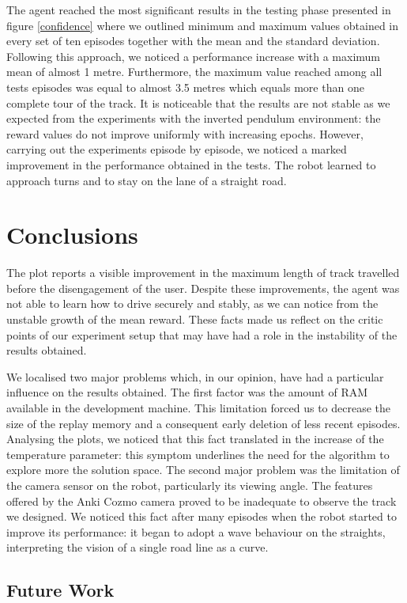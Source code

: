 \documentclass[10pt,twocolumn,letterpaper]{article}
\begin{document}
The agent reached the most significant results in the testing phase presented in figure \ref{confidence} where we outlined minimum and maximum values obtained in every set of ten episodes together with the mean and the standard deviation.
Following this approach, we noticed a performance increase with a maximum mean of almost 1 metre.
Furthermore, the maximum value reached among all tests episodes was equal to almost 3.5 metres which equals more than one complete tour of the track.
It is noticeable that the results are not stable as we expected from the experiments with the inverted pendulum environment: the reward values do not improve uniformly with increasing epochs.
However, carrying out the experiments episode by episode, we noticed a marked improvement in the performance obtained in the tests.
The robot learned to approach turns and to stay on the lane of a straight road.

\section{Conclusions}

The plot reports a visible improvement in the maximum length of track travelled before the disengagement of the user.
Despite these improvements, the agent was not able to learn how to drive securely and stably, as we can notice from the unstable growth of the mean reward.
These facts made us reflect on the critic points of our experiment setup that may have had a role in the instability of the results obtained.

We localised two major problems which, in our opinion, have had a particular influence on the results obtained.
The first factor was the amount of RAM available in the development machine.
This limitation forced us to decrease the size of the replay memory and a consequent early deletion of less recent episodes.
Analysing the plots, we noticed that this fact translated in the increase of the temperature parameter: this symptom underlines the need for the algorithm to explore more the solution space.
The second major problem was the limitation of the camera sensor on the robot, particularly its viewing angle.
The features offered by the Anki Cozmo camera proved to be inadequate to observe the track we designed.
We noticed this fact after many episodes when the robot started to improve its performance: it began to adopt a wave behaviour on the straights, interpreting the vision of a single road line as a curve.

\subsection{Future Work}
\end{document}
